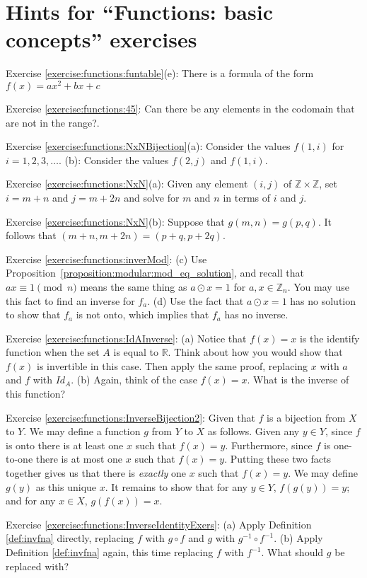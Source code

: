 \section{Hints for ``Functions: basic concepts'' exercises}\label{sec:functions:hints}

\noindent Exercise \ref{exercise:functions:funtable}(e): There is a formula of the form $f(x) = ax^2 + bx + c$

\noindent Exercise \ref{exercise:functions:45}: Can there be any elements in the codomain that are not in the range?.

\noindent Exercise \ref{exercise:functions:NxNBijection}(a): Consider the values $f(1,i)$  for $i=1,2,3,\ldots$. (b): Consider  the values $f(2,j)$ and $f(1,i)$.

\noindent Exercise \ref{exercise:functions:NxN}(a): Given any element $(i,j)$ of $\mathbb{Z} \times \mathbb{Z}$, set $i=m+n$ and $j=m+2n$ and solve for $m$ and $n$ in terms of $i$ and $j$.

\noindent Exercise \ref{exercise:functions:NxN}(b): Suppose that $g(m,n) = g(p,q)$. It follows that $(m + n, m + 2n) = (p + q, p + 2q)$. %

\noindent Exercise \ref{exercise:functions:inverMod}: (c) 
Use Proposition~\ref{proposition:modular:mod_eq_solution}, and recall that $ax \equiv 1 \pmod{n}$ means the same thing as $a \odot x = 1$ for $a,x \in \mathbb{Z}_n$.  You may use this fact to find an inverse for $f_a$. (d) Use the fact that $a \odot x = 1$ has no solution to  show that $f_a$ is not onto, which implies that $f_a$ has no inverse.

\noindent Exercise \ref{exercise:functions:IdAInverse}: (a) Notice that $f(x)=x$ is the identify function when the set $A$ is equal to $\mathbb{R}$.  Think about how you would show that $f(x)$ is invertible in this case.  Then apply the same proof, replacing $x$ with $a$ and $f$ with
$Id_A$.  (b) Again, think of the case $f(x)=x$.  What is the inverse of this function? 

\noindent Exercise \ref{exercise:functions:InverseBijection2}: Given that $f$ is a bijection from $X$ to $Y$. We may define a function $g$ from $Y$ to $X$ as follows.  Given any $y \in Y$, since $f$ is onto there is at least one $x$ such that $f(x) = y$. Furthermore, since $f$ is one-to-one there is at most one $x$ such that $f(x)=y$. Putting these two facts together gives us that there is \emph{exactly} one $x$ such that $f(x)=y$.  We may define $g(y)$ as this unique $x$. It remains to show that for any $y \in Y$, $f(g(y))=y$; and for any $x \in X$, $g(f(x))=x$.

\noindent Exercise \ref{exercise:functions:InverseIdentityExers}: (a) Apply Definition  \ref{def:invfna} directly, replacing $f$ with
$g \circ f$ and $g$ with $g^{-1} \circ f^{-1}$. (b) Apply Definition  \ref{def:invfna} again, this time replacing $f$ with
$f^{-1}$. What should $g$ be replaced with?

